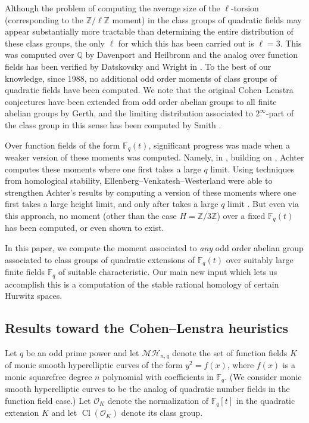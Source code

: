 \documentclass[12 pt]{amsart}
\theoremstyle{plain}
\theoremstyle{definition}
\theoremstyle{remark}
\numberwithin{equation}{section}
\DeclareMathOperator\cl{Cl}
\begin{document}
Although the problem of computing the average size of the $\ell$-torsion
(corresponding to the $\mathbb Z/\ell \mathbb Z$ moment) in the
class groups of quadratic fields may appear substantially more tractable than
determining the entire distribution of these class groups, the only $\ell$ for
which this has been carried out is $\ell = 3$.
This was computed
over $\mathbb Q$ by Davenport and Heilbronn \cite{davenportH:density-discriminants-cubica}
and the analog over function fields has been verified by Datskovsky and Wright
in 
\cite{datskovsky-wright:density-of-discriminants-of-cubic-extensions}.
To the best of our knowledge, since 1988, no additional odd order moments of class groups
of quadratic fields have been
computed.
We note that the original Cohen--Lenstra conjectures have been extended from
odd order abelian groups to all finite abelian groups by Gerth, and the 
limiting distribution
associated to $2^\infty$-part of the class group in this sense has been computed by Smith
\cite[Theorem 1.9]{smith:the-distribution-of-selmer-groups-1}.

Over function fields of the form $\mathbb F_q(t)$, significant progress was made
when a weaker version of these
moments was computed.
Namely, in
\cite[Theorem 3.1]{Achter:cohenQuadratic}, building on
\cite{Achter:distributionClassGroups},
Achter computes these moments where one first takes a large $q$ limit.
Using techniques from homological stability, Ellenberg--Venkatesh--Westerland
were able to strengthen Achter's results by computing a version of these moments where one first takes a large
height limit, and only after takes a large $q$ limit
\cite{EllenbergVW:cohenLenstra}. But even via this approach, no moment (other
than the case $H = \mathbb Z/3 \mathbb Z$) over a fixed $\mathbb
F_q(t)$ has been computed, or even shown to exist.

In this paper, we
compute the moment associated to {\em any} odd order abelian group
associated to class groups of quadratic extensions of $\mathbb F_q(t)$ over
suitably large finite fields $\mathbb F_q$ of suitable characteristic.
Our main new input which lets us accomplish this is a computation of the stable rational
homology of certain Hurwitz spaces.



\subsection{Results toward the Cohen--Lenstra heuristics}

Let $q$ be an odd prime power and 
let $\mathcal{MH}_{n,q}$ denote the set of function fields $K$
of monic smooth hyperelliptic curves of the form $y^2 = f(x)$, where $f(x)$ is a monic
squarefree degree $n$ polynomial with coefficients in $\mathbb F_q$.
(We consider monic smooth hyperelliptic curves to be the analog of quadratic number fields in
the function field case.)
Let $\mathscr O_K$ denote the normalization of $\mathbb F_q[t]$
in the quadratic extension $K$ and let $\cl(\mathscr O_K)$ denote its class group.
\end{document}

